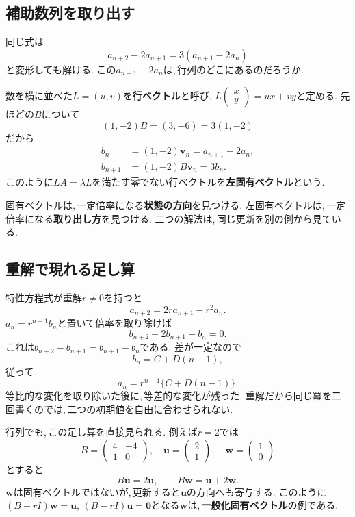 \subsection{補助数列を取り出す}

同じ式は
\[
 a_{n+2}-2a_{n+1}
 =3(a_{n+1}-2a_n)
\]
と変形しても解ける.
この$a_{n+1}-2a_n$は,\,行列のどこにあるのだろうか.

数を横に並べた$L=(u,v)$を\textbf{行ベクトル}と呼び,
$L\begin{pmatrix}x\\y\end{pmatrix}=ux+vy$と定める.
先ほどの$B$について
\[
 (1,-2)B=(3,-6)=3(1,-2)
\]
だから
\[
 \begin{aligned}
 b_n&=(1,-2)\boldsymbol v_n=a_{n+1}-2a_n,\\
 b_{n+1}&=(1,-2)B\boldsymbol v_n=3b_n.
 \end{aligned}
\]
このように$LA=\lambda L$を満たす零でない行ベクトルを\textbf{左固有ベクトル}という.

固有ベクトルは,\,一定倍率になる\textbf{状態の方向}を見つける.
左固有ベクトルは,\,一定倍率になる\textbf{取り出し方}を見つける.
二つの解法は,\,同じ更新を別の側から見ている.

\subsection{重解で現れる足し算}\label{節：重解で現れる足し算}

特性方程式が重解$r\ne0$を持つと
\[
 a_{n+2}=2r a_{n+1}-r^2a_n.
\]
$a_n=r^{n-1}b_n$と置いて倍率を取り除けば
\[
 b_{n+2}-2b_{n+1}+b_n=0.
\]
これは$b_{n+2}-b_{n+1}=b_{n+1}-b_n$である.
差が一定なので
\[
 b_n=C+D(n-1),
\]
従って
\[
 a_n=r^{n-1}\{C+D(n-1)\}.
\]
等比的な変化を取り除いた後に,\,等差的な変化が残った.
重解だから同じ冪を二回書くのでは,\,二つの初期値を自由に合わせられない.

行列でも,\,この足し算を直接見られる.
例えば$r=2$では
\[
 B=\begin{pmatrix}4&-4\\1&0\end{pmatrix},
 \quad
 \boldsymbol u=\begin{pmatrix}2\\1\end{pmatrix},
 \quad
 \boldsymbol w=\begin{pmatrix}1\\0\end{pmatrix}
\]
とすると
\[
 B\boldsymbol u=2\boldsymbol u,\qquad
 B\boldsymbol w=\boldsymbol u+2\boldsymbol w.
\]
$\boldsymbol w$は固有ベクトルではないが,\,更新すると$\boldsymbol u$の方向へも寄与する.
このように$(B-rI)\boldsymbol w=\boldsymbol u$,
$(B-rI)\boldsymbol u=\boldsymbol0$となる$\boldsymbol w$は,\,\textbf{一般化固有ベクトル}の例である.


